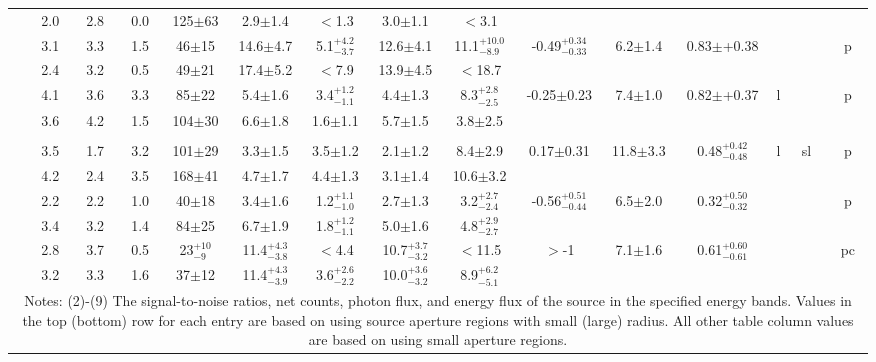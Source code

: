 \documentclass[iop,revtex4]{emulateapj}
\newcommand\T{\rule{0pt}{2.6ex}}       %
\newcommand\B{\rule[-1.2ex]{0pt}{0pt}} %
\newcommand\M{\rule{0pt}{2.3ex}}
\newcommand\U{\rule{0pt}{3.2ex}}       %
\begin{document}
\begin{landscape}
{\begin{longtable}{ccccccccccccp{0.25in}p{0.25in}c}
\M&2.0&2.8&0.0&125$\pm$63&2.9$\pm$1.4&$<$1.3&3.0$\pm$1.1&$<$3.1&&&&&&\\
\U\multirow{2}{*}{34}&3.1&3.3&1.5&46$\pm$15&14.6$\pm$4.7&5.1$^{+4.2}_{-3.7}$&12.6$\pm$4.1&11.1$^{+10.0}_{-8.9}$&\multirow{2}{*}{-0.49$^{+0.34}_{-0.33}$}&\multirow{2}{*}{6.2$\pm$1.4}&\multirow{2}{*}{0.83$\pm$+0.38}&\multirow{2}{*}{}&\multirow{2}{*}{}&\multirow{2}{*}{p}\\
\M&2.4&3.2&0.5&49$\pm$21&17.4$\pm$5.2&$<$7.9&13.9$\pm$4.5&$<$18.7&&&&&&\\
\U\multirow{2}{*}{35}&4.1&3.6&3.3&85$\pm$22&5.4$\pm$1.6&3.4$^{+1.2}_{-1.1}$&4.4$\pm$1.3&8.3$^{+2.8}_{-2.5}$&\multirow{2}{*}{-0.25$\pm$0.23}&\multirow{2}{*}{7.4$\pm$1.0}&\multirow{2}{*}{0.82$\pm$+0.37}&\multirow{2}{*}{l}&\multirow{2}{*}{}&\multirow{2}{*}{p}\\
\M&3.6&4.2&1.5&104$\pm$30&6.6$\pm$1.8&1.6$\pm$1.1&5.7$\pm$1.5&3.8$\pm$2.5&&&&&&\\
&&&&&&&&&&&&&&\\
\U\multirow{2}{*}{36}&3.5&1.7&3.2&101$\pm$29&3.3$\pm$1.5&3.5$\pm$1.2&2.1$\pm$1.2&8.4$\pm$2.9&\multirow{2}{*}{0.17$\pm$0.31}&\multirow{2}{*}{11.8$\pm$3.3}&\multirow{2}{*}{0.48$^{+0.42}_{-0.48}$}&\multirow{2}{*}{l}&\multirow{2}{*}{sl}&\multirow{2}{*}{p}\\
\M&4.2&2.4&3.5&168$\pm$41&4.7$\pm$1.7&4.4$\pm$1.3&3.1$\pm$1.4&10.6$\pm$3.2&&&&&&\\
\U\multirow{2}{*}{37}&2.2&2.2&1.0&40$\pm$18&3.4$\pm$1.6&1.2$^{+1.1}_{-1.0}$&2.7$\pm$1.3&3.2$^{+2.7}_{-2.4}$&\multirow{2}{*}{-0.56$^{+0.51}_{-0.44}$}&\multirow{2}{*}{6.5$\pm$2.0}&\multirow{2}{*}{0.32$^{+0.50}_{-0.32}$}&\multirow{2}{*}{}&\multirow{2}{*}{}&\multirow{2}{*}{p}\\
\M&3.4&3.2&1.4&84$\pm$25&6.7$\pm$1.9&1.8$^{+1.2}_{-1.1}$&5.0$\pm$1.6&4.8$^{+2.9}_{-2.7}$&&&&&&\\
\U\multirow{2}{*}{38}&2.8&3.7&0.5&23$^{+10}_{-9}$&11.4$^{+4.3}_{-3.8}$&$<$4.4&10.7$^{+3.7}_{-3.2}$&$<$11.5&\multirow{2}{*}{$>$-1}&\multirow{2}{*}{7.1$\pm$1.6}&\multirow{2}{*}{0.61$^{+0.60}_{-0.61}$}&\multirow{2}{*}{}&\multirow{2}{*}{}&\multirow{2}{*}{pc}\\
\M\B&3.2&3.3&1.6&37$\pm$12&11.4$^{+4.3}_{-3.9}$&3.6$^{+2.6}_{-2.2}$&10.0$^{+3.6}_{-3.2}$&8.9$^{+6.2}_{-5.1}$&&&&&&\\
\hline\hline
\multicolumn{15}{p{8.9in}}{\T Notes: (2)-(9) The signal-to-noise ratios, net counts, photon flux, and energy flux of the source in the specified energy bands. Values in the top (bottom) row for each entry are based on using source aperture regions with small (large) radius.  All other table column values are based on using small aperture regions. 

}
\end{longtable}}
\end{landscape}
\end{document}
